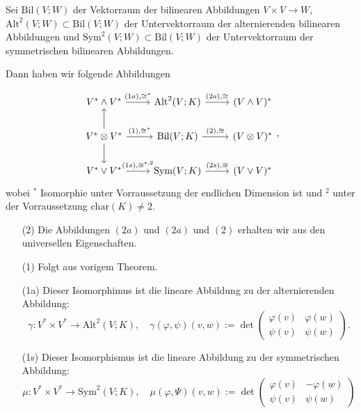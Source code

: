 \documentclass[8pt, a4paper, twocolumn, landscape]{article}
\begin{document}
\begin{example}
Sei $\mathrm{Bil}(V; W)$ der Vektorraum der bilinearen Abbildungen $V \times V \rightarrow W$, $\mathrm{Alt}^2(V; W) \subset \mathrm{Bil}(V; W)$ der Untervektorraum der alternierenden bilinearen Abbildungen und $\mathrm{Sym}^2(V;W) \subset \mathrm{Bil}(V; W)$ der Untervektorraum der symmetrischen bilinearen Abbildungen.

Dann haben wir folgende Abbildungen 

\begin{equation*}
\begin{tikzcd}
V^* \wedge V^* \arrow[r, "{(1a), \cong^*}"]                     & \mathrm{Alt}^2(V;K) \arrow[r, "{(2a), \cong}"] & (V \wedge V)^*  \\
V^* \otimes V^* \arrow[u] \arrow[r, "{(1), \cong^*}"] \arrow[d] & \mathrm{Bil}(V;K) \arrow[r, "{(2), \cong}"]    & (V \otimes V)^* \\
V^* \vee V^* \arrow[r, "{(1s), \cong^{*,2}}"]                   & \mathrm{Sym}(V;K) \arrow[r, "{(2s), \cong}"]   & (V \vee V)^*   
\end{tikzcd},
\end{equation*}
wobei $^*$ Isomorphie unter Vorraussetzung der endlichen Dimension ist und $^2$  unter der Vorraussetzung $\mathrm{char}(K) \neq 2.$
\begin{enumerate}
\item[(2)] Die Abbildungen $(2a)$ und $(2a)$ und $(2)$ erhalten wir aus den universellen Eigenschaften.
\item[(1)] Folgt aus vorigem Theorem.
\item[(1a)]
Dieser Isomorphimus ist die lineare Abbildung zu der alternierenden Abbildung:
$$ 
\gamma: V^* \times V^* \rightarrow \mathrm{Alt}^2(V;K), \quad
\gamma(\varphi, \psi)(v, w):=\operatorname{det}\left(\begin{array}{cc}\varphi(v) & \varphi(w) \\ \psi(v) & \psi(w)\end{array}\right).
$$
\item[(1s)]
Dieser Isomorphismus ist die lineare Abbildung zu der symmetrischen Abbildung:
$$
\mu: V^* \times V^* \rightarrow \mathrm{Sym}^2 (V;K)
, \quad 
\mu(\varphi, \Psi)(v, w) := \operatorname{det}\left(\begin{array}{cc}\varphi(v) & - \varphi(w) \\ \psi(v) & \psi(w)\end{array}\right)
$$
\end{enumerate}
\end{example}
\end{document}
